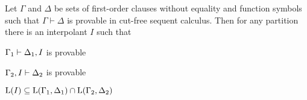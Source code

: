

\begin{lemma}[Maehara]
	\label{lemma:maehara}
	Let $\Gamma$ and $\Delta$ be sets of first-order clauses without equality and function symbols such that $\Gamma \vdash \Delta$ is provable in cut-free sequent calculus.
	Then for any partition 
	there is an interpolant $I$ such that
	\begin{compactenum}
	\item $\Gamma_1 \vdash \Delta_1, I$ is provable 
		\label{maehcond1}
	\item $\Gamma_2, I \vdash \Delta_2$ is provable 
		\label{maehcond2}
	\item $\operatorname{L}(I) \subseteq \operatorname{L}(\Gamma_1, \Delta_1) \cap \operatorname{L}(\Gamma_2, \Delta_2)$
		\label{maehcond3}
	\end{compactenum}
\end{lemma}
